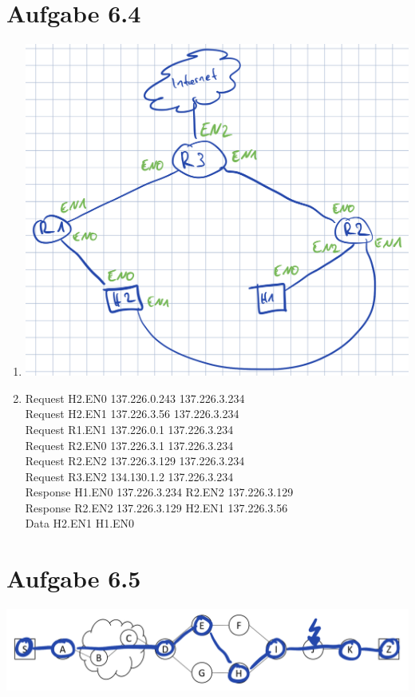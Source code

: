 \documentclass[12pt, a4paper]{article}
\begin{document}
\section*{Aufgabe 6.4}
\begin{enumerate}[label=\alph*)]
	\item	\includegraphics[scale=0.5]{6.4_a.png}
	\item	Request H2.EN0 137.226.0.243 137.226.3.234 \\
			Request H2.EN1 137.226.3.56 137.226.3.234 \\
			
			Request R1.EN1 137.226.0.1 137.226.3.234 \\
			Request R2.EN0 137.226.3.1 137.226.3.234 \\
			Request R2.EN2 137.226.3.129 137.226.3.234 \\
			
			Request R3.EN2 134.130.1.2 137.226.3.234 \\
			Response H1.EN0 137.226.3.234 R2.EN2 137.226.3.129 \\
			
			Response R2.EN2 137.226.3.129 H2.EN1 137.226.3.56 \\
			
			Data H2.EN1 H1.EN0
\end{enumerate}


\newpage


\section*{Aufgabe 6.5}
\includegraphics[scale=0.5]{6.5.png}
\end{document}
